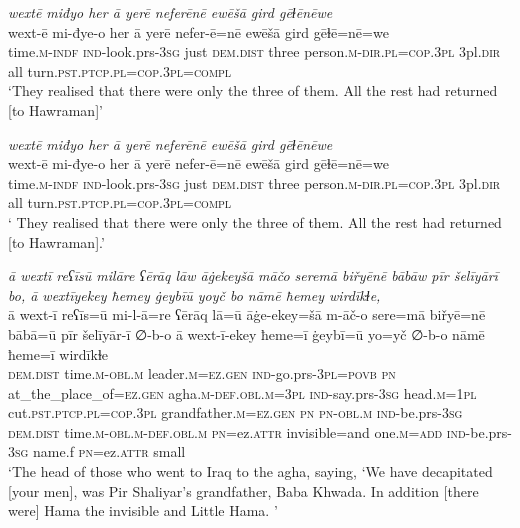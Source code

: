 \ea \label{BP.107}
\textit{wextē miđyo her ā yerē neferēnē ewēšā gird gēɫēnēwe} \\ 
\gll wext-ē mi-đye-o her ā yerē nefer-ē=nē ewēšā gird gēɫē=nē=we \\ 
 time\textsc{.m}\textsc{-indf} \textsc{ind-}look.prs\textsc{-3sg} just \textsc{dem.dist} three person\textsc{.m}\textsc{-dir}\textsc{.pl}\textsc{=cop}\textsc{.3pl} 3pl\textsc{.dir} all turn\textsc{.pst}\textsc{.ptcp}\textsc{.pl}\textsc{=cop}\textsc{.3pl}\textsc{=compl} \\ 
\glt `They realised that there were only the three of them. All the rest had returned [to Hawraman]'
\z 
 
\ea \label{BP.108}
\textit{wextē miđyo her ā yerē neferēnē ewēšā gird gēɫēnēwe} \\ 
\gll wext-ē mi-đye-o her ā yerē nefer-ē=nē ewēšā gird gēɫē=nē=we \\ 
 time\textsc{.m}\textsc{-indf} \textsc{ind-}look.prs\textsc{-3sg} just \textsc{dem.dist} three person\textsc{.m}\textsc{-dir}\textsc{.pl}\textsc{=cop}\textsc{.3pl} 3pl\textsc{.dir} all turn\textsc{.pst}\textsc{.ptcp}\textsc{.pl}\textsc{=cop}\textsc{.3pl}\textsc{=compl} \\ 
\glt ` They realised that there were only the three of them. All the rest had returned [to Hawraman].'
\z 
 
\ea \label{BP.122}
\textit{ā wextī reʕīsū milāre ʕērāq lāw āġekeyšā māčo seremā biřyēnē bābāw pīr šelīyārī bo, ā wextīyekey ħemey ġeybīū yoyč bo nāmē ħemey wirdīkɫe,} \\ 
\gll ā wext-ī reʕīs=ū mi-l-ā=re ʕērāq lā=ū āġe-ekey=šā m-āč-o sere=mā biřyē=nē bābā=ū pīr šelīyār-ī ∅-b-o ā wext-ī-ekey ħeme=ī ġeybī=ū yo=yč ∅-b-o nāmē ħeme=ī wirdīkɫe \\ 
 \textsc{dem.dist} time\textsc{.m}\textsc{-obl}\textsc{.m} leader\textsc{.m}\textsc{=ez.gen} \textsc{ind-}go.prs\textsc{-3pl}\textsc{=\textsc{povb}} \textsc{pn} at\_the\_place\_of\textsc{=ez.gen} agha\textsc{.m}\textsc{-def}\textsc{.obl}\textsc{.m}\textsc{=3pl} \textsc{ind-}say.prs\textsc{-3sg} head\textsc{.m}\textsc{=\textsc{1pl}} cut\textsc{.pst}\textsc{.ptcp}\textsc{.pl}\textsc{=cop}\textsc{.3pl} grandfather\textsc{.m}\textsc{=ez.gen} \textsc{pn} \textsc{pn}\textsc{-obl}\textsc{.m} \textsc{ind-}be.prs\textsc{-3sg} \textsc{dem.dist} time\textsc{.m}\textsc{-obl}\textsc{.m}\textsc{-def}\textsc{.obl}\textsc{.m} \textsc{pn}=ez.\textsc{attr} invisible=and one\textsc{.m}\textsc{=add} \textsc{ind-}be.prs\textsc{-3sg} name.f \textsc{pn}=ez.\textsc{attr} small \\ 
\glt `The head of those who went to Iraq to the agha, saying, ‘We have decapitated [your men], was Pir Shaliyar’s grandfather, Baba Khwada. In addition [there were] Hama the invisible and Little Hama. '
\z 
 
